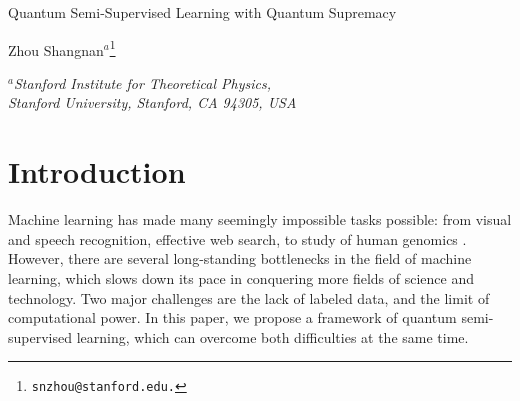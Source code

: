 \documentclass[11pt]{article}
\theoremstyle{definition}
\renewcommand{\title}[1]{\vbox{\center\LARGE{#1}}\vspace{5mm}}
\newcommand{\address}[1]{\vbox{\center\em#1}}
\begin{document}
\title{Quantum Semi-Supervised Learning with Quantum Supremacy}

\begin{center}
\vspace{5mm}
Zhou Shangnan$^{a}$\footnote{\tt snzhou@stanford.edu.}
\end{center}

\address{${}^a$Stanford Institute for Theoretical Physics, \\
Stanford University, Stanford, CA 94305, USA}





\begin{abstract}
    Quantum machine learning promises to efficiently solve important problems. There are two persistent challenges in classical machine learning: the lack of labeled data, and the limit of computational power. We propose a novel framework that resolves both issues: quantum semi-supervised learning. Moreover, we provide a protocol in systematically designing quantum machine learning algorithms with quantum supremacy, which can be extended beyond quantum semi-supervised learning. In the meantime, we show that naive quantum matrix product estimation algorithm outperforms the best known classical matrix multiplication algorithm.
    We showcase two concrete quantum semi-supervised learning algorithms: a quantum self-training algorithm named the propagating nearest-neighbor classifier, and the quantum semi-supervised K-means clustering algorithm. By doing time complexity analysis, we conclude that they indeed possess quantum supremacy.
\end{abstract}

\section{Introduction}

Machine learning has made many seemingly impossible tasks possible: from visual and speech recognition, effective web search, to study of human genomics \cite{lecun2015deep,alphafold}. However, there are several long-standing bottlenecks in the field of machine learning, which slows down its pace in conquering more fields of science and technology. Two major challenges are the lack of labeled data, and the limit of computational power. In this paper, we propose a framework of quantum semi-supervised learning, which can overcome both difficulties at the same time. 
\end{document}
